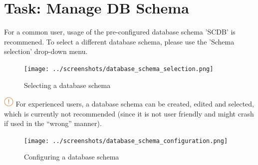 \section{Task: Manage DB Schema}
\label{sec:task_manage_db_schema}

For a common user, usage of the pre-configured database schema 'SCDB' is recommened. To select a different database schema, please use the 'Schema selection' drop-down menu.\\

\begin{figure}[H]
  \center
    \texttt{[image: ../screenshots/database\_schema\_selection.png]}
  \caption{Selecting a database schema}
  \label{fig:db_schema_select}
\end{figure}

\includegraphics[width=0.5cm]{../../data/icons/hint.png} For experienced users, a database schema can be created, edited and selected, which is currently not recommended (since it is not user friendly and might crash if used in the ``wrong'' manner).

\begin{figure}[H]
  \hspace*{-1cm}
    \texttt{[image: ../screenshots/database\_schema\_configuration.png]}
  \caption{Configuring a database schema}
  \label{fig:db_schema_configuration}
\end{figure} 
